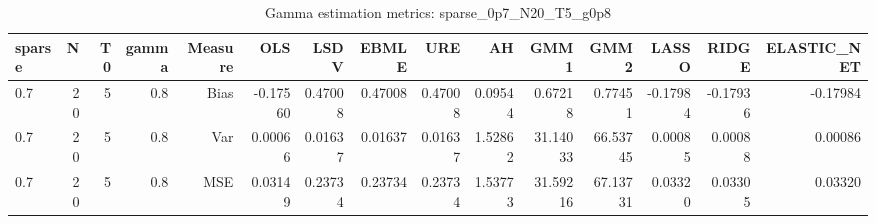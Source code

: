 \begin{table}[!htbp]\centering
\caption{Gamma estimation metrics: sparse_0p7_N20_T5_g0p8}
\label{tab:table1_sparse_0p7_N20_T5_g0p8}
\begin{tabular}{lrrrrrrrrrrrrrr}
\hline
sparse & N & T0 & gamma & Measure & OLS & LSDV & EBMLE & URE & AH & GMM1 & GMM2 & LASSO & RIDGE & ELASTIC_NET \\
\hline
0.7 & 20 & 5 & 0.8 & Bias & -0.17560 & 0.47008 & 0.47008 & 0.47008 & 0.09544 & 0.67218 & 0.77451 & -0.17984 & -0.17936 & -0.17984 \\
0.7 & 20 & 5 & 0.8 & Var & 0.00066 & 0.01637 & 0.01637 & 0.01637 & 1.52862 & 31.14033 & 66.53745 & 0.00085 & 0.00088 & 0.00086 \\
0.7 & 20 & 5 & 0.8 & MSE & 0.03149 & 0.23734 & 0.23734 & 0.23734 & 1.53773 & 31.59216 & 67.13731 & 0.03320 & 0.03305 & 0.03320 \\
\hline
\end{tabular}
\end{table}

